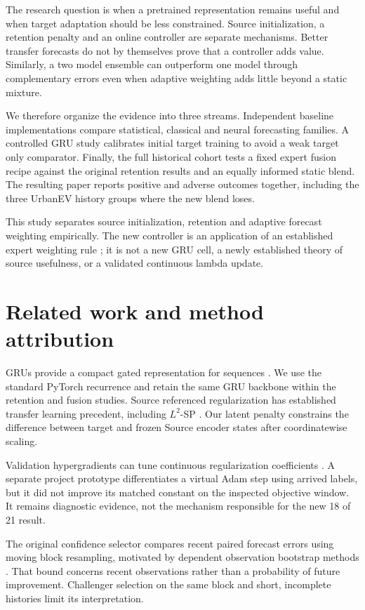 \documentclass[pdflatex,iicol,sn-mathphys-num]{sn-jnl}
\begin{document}
The research question is when a pretrained representation remains useful and when target adaptation should be less constrained. Source initialization, a retention penalty and an online controller are separate mechanisms. Better transfer forecasts do not by themselves prove that a controller adds value. Similarly, a two model ensemble can outperform one model through complementary errors even when adaptive weighting adds little beyond a static mixture.

We therefore organize the evidence into three streams. Independent baseline implementations compare statistical, classical and neural forecasting families. A controlled GRU study calibrates initial target training to avoid a weak target only comparator. Finally, the full historical cohort tests a fixed expert fusion recipe against the original retention results and an equally informed static blend. The resulting paper reports positive and adverse outcomes together, including the three UrbanEV history groups where the new blend loses.

This study separates source initialization, retention and adaptive forecast weighting empirically. The new controller is an application of an established expert weighting rule \cite{herbster1998}; it is not a new GRU cell, a newly established theory of source usefulness, or a validated continuous lambda update.

\section{Related work and method attribution}

GRUs provide a compact gated representation for sequences \cite{cho2014}. We use the standard PyTorch recurrence \cite{pytorch211} and retain the same GRU backbone within the retention and fusion studies. Source referenced regularization has established transfer learning precedent, including $L^2$-SP \cite{li2018}. Our latent penalty constrains the difference between target and frozen Source encoder states after coordinatewise scaling.

Validation hypergradients can tune continuous regularization coefficients \cite{luketina2016}. A separate project prototype differentiates a virtual Adam step using arrived labels, but it did not improve its matched constant on the inspected objective window. It remains diagnostic evidence, not the mechanism responsible for the new 18 of 21 result.

The original confidence selector compares recent paired forecast errors using moving block resampling, motivated by dependent observation bootstrap methods \cite{kunsch1989}. That bound concerns recent observations rather than a probability of future improvement. Challenger selection on the same block and short, incomplete histories limit its interpretation.
\end{document}
